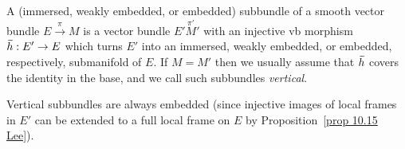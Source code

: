\begin{defn}
    A (immersed, weakly embedded, or embedded) subbundle of a smooth vector bundle $E\overset{\pi}{\to}M$ is a vector bundle $E'\overset{\pi'}M'$ with an injective \gls{vb} morphism $\wt{h}:E'\to E$ which turns $E'$ into an immersed, weakly embedded, or embedded, respectively, submanifold of $E$. If $M=M'$ then we usually assume that $\wt{h}$ covers the identity in the base, and we call such subbundles \emph{vertical}. 
\end{defn}

\begin{rem}
    Vertical subbundles are always embedded (since injective images of local frames in $E'$ can be extended to a full local frame on $E$ by Proposition~\ref{prop 10.15 Lee}).
\end{rem}

